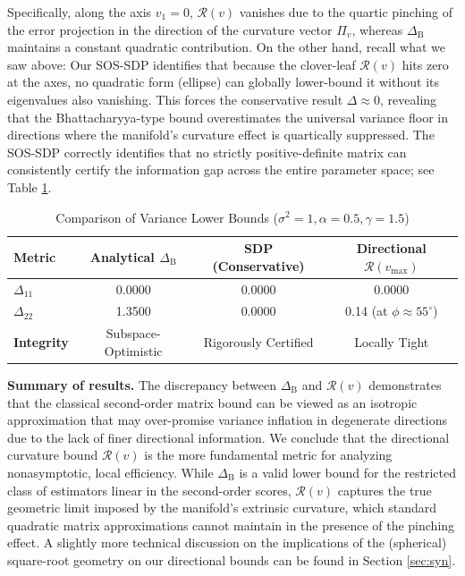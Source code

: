 \documentclass[pdflatex,sn-mathphys-num]{sn-jnl}%
\theoremstyle{thmstyleone}%
\theoremstyle{thmstyletwo}%
\theoremstyle{thmstylethree}%
\begin{document}
Specifically, along the axis \(v_1=0\), $\mathcal{R}(v)$ vanishes due to the quartic pinching of the error projection in the direction of the curvature vector $\Pi_v$, whereas $\Delta_{\mathrm{B}}$ maintains a constant quadratic contribution. On the other hand, recall what we saw above: Our SOS-SDP identifies that because the clover-leaf $\mathcal{R}(v)$ hits zero at the axes, no quadratic form (ellipse) can globally lower-bound it without its eigenvalues also vanishing. This forces the conservative result $\Delta \approx 0$, revealing that the Bhattacharyya-type bound overestimates the universal variance floor in directions where the manifold's curvature effect is quartically suppressed. The SOS-SDP correctly identifies that no strictly positive-definite matrix can consistently certify the information gap across the entire parameter space; see Table \ref{tab:results}.

\begin{table}[ht]
\centering
\caption{Comparison of Variance Lower Bounds ($\sigma^2=1, \alpha=0.5, \gamma=1.5$)}
\label{tab:results}
\begin{tabular}{@{}lccc@{}}
\toprule
\textbf{Metric} & \textbf{Analytical $\Delta_{\mathrm{B}}$} & \textbf{SDP (Conservative)} & \textbf{Directional $\mathcal{R}(v_{\text{max}})$} \\ \midrule
$\Delta_{11}$ & 0.0000 & 0.0000 & 0.0000 \\
$\Delta_{22}$ & 1.3500 & 0.0000 & 0.14 (at $\phi \approx 55^\circ$) \\
\textbf{Integrity} & Subspace-Optimistic & Rigorously Certified & Locally Tight \\ \bottomrule
\end{tabular}
\end{table}

\noindent
\textbf{Summary of results.}
The discrepancy between $\Delta_{\mathrm{B}}$ and $\mathcal{R}(v)$ demonstrates that the classical second-order matrix bound can be viewed as an isotropic approximation that may over-promise variance inflation in degenerate directions due to the lack of finer directional information. We conclude that the directional curvature bound $\mathcal{R}(v)$ is the more fundamental metric for analyzing nonasymptotic, local efficiency. While $\Delta_{\mathrm{B}}$ is a valid lower bound for the restricted class of estimators linear in the second-order scores, $\mathcal{R}(v)$ captures the true geometric limit imposed by the manifold's extrinsic curvature, which standard quadratic matrix approximations cannot maintain in the presence of the pinching effect. A slightly more technical discussion on the implications of the (spherical) square-root geometry on our directional bounds can be found in Section \ref{sec:syn}.
\end{document}
